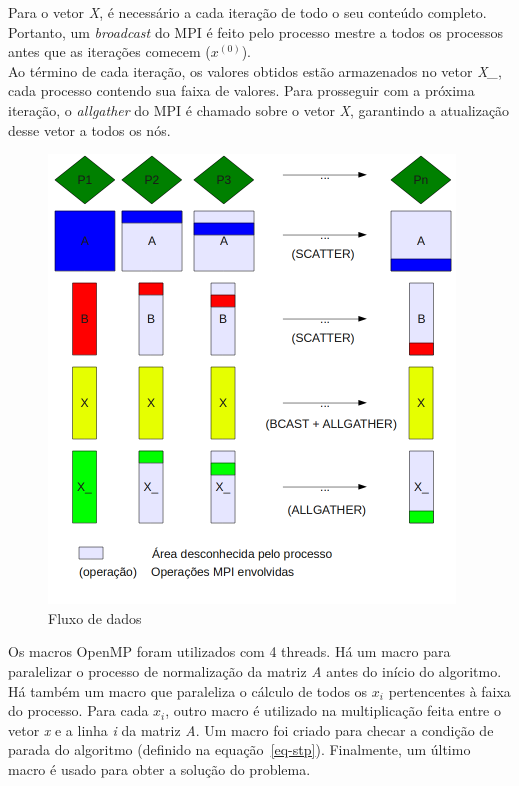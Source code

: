 \documentclass[a4paper]{article}
\begin{document}
\indent Para o vetor \emph{X}, é necessário a cada iteração de todo o seu conteúdo completo. Portanto, um \emph{broadcast} do MPI é feito pelo processo mestre a todos os processos antes que as iterações comecem (\begin{math}x^{(0)}\end{math}).\\
\indent Ao término de cada iteração, os valores obtidos estão armazenados no vetor \emph{X\_}, cada processo contendo sua faixa de valores. Para prosseguir com a próxima iteração, o \emph{allgather} do MPI é chamado sobre o vetor \emph{X}, garantindo a atualização desse vetor a todos os nós.\\
\begin{figure}[float=p]
	\centerline{\includegraphics[width=408px, height=450px]{data}}
	\caption{Fluxo de dados}
	\label{pic-data}
\end{figure}
\indent Os macros OpenMP foram utilizados com 4 threads. Há um macro para paralelizar o processo de normalização da matriz \emph{A} antes do início do algoritmo. Há também um macro que paraleliza o cálculo de todos os \begin{math}x_i\end{math} pertencentes à faixa do processo. Para cada \begin{math}x_i\end{math}, outro macro é utilizado na multiplicação feita entre o vetor \emph{x} e a linha \emph{i} da matriz \emph{A}. Um macro foi criado para checar a condição de parada do algoritmo (definido na equação~\ref{eq-stp}). Finalmente, um último macro é usado para obter a solução do problema.
\end{document}
